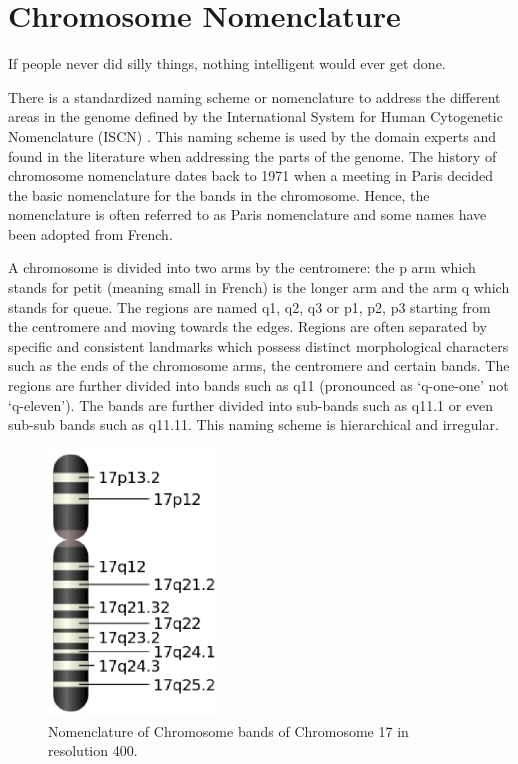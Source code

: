 \chapter{Chromosome Nomenclature}
\label{ap:appendNom}

\begin{fquote}If people never did silly things, nothing intelligent would ever get done.  \end{fquote} 

There is a standardized naming scheme or nomenclature to address the different areas in the genome defined by the International System for Human Cytogenetic Nomenclature (ISCN) \cite{iscn}. This naming scheme is used by the domain experts and found in the literature when addressing the parts of the genome. The history of chromosome nomenclature dates back to 1971 when a meeting in Paris decided the basic nomenclature for the bands in the chromosome. Hence, the nomenclature is often referred to as Paris nomenclature and some names have been adopted from French.

A chromosome is divided into two arms by the centromere: the p arm which stands for petit (meaning small in French)  is the longer arm and the arm q which stands for queue. The regions are named q1, q2, q3 or p1, p2, p3 starting from the centromere and moving towards the edges. Regions are often separated by specific and consistent landmarks which possess distinct morphological characters such as the ends of the chromosome arms, the centromere and certain bands. The regions are further divided into bands such as q11 (pronounced as ‘q-one-one’ not ‘q-eleven’). The bands are further divided into sub-bands such as q11.1 or even sub-sub bands such as q11.11. This naming scheme is hierarchical and irregular.

\begin{figure}[h!]
\centering
\includegraphics[width=0.4\textwidth]{figures/chromonomen}
\caption[Regions in chromosome 17 and resolution 400]{Nomenclature of Chromosome bands of Chromosome 17 in resolution 400.} \label{Fig:chromonomen}
\end{figure}

